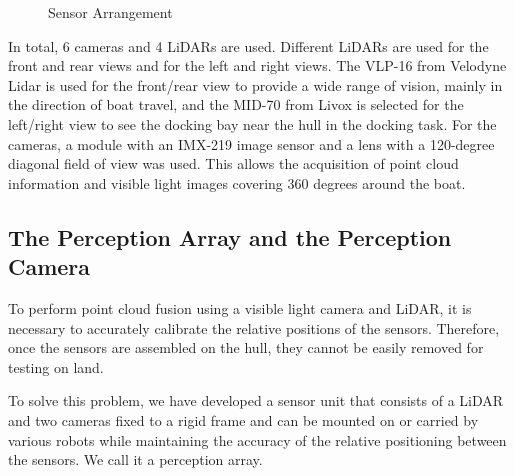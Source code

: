 \documentclass[lettersize,journal]{IEEEtran}
\begin{document}
\begin{figure}[htbp]
  \begin{center}
  \end{center}
  \caption{Sensor Arrangement}
  \label{fig:sensor_arrangement}
\end{figure}

In total, 6 cameras and 4 LiDARs are used.
Different LiDARs are used for the front and rear views and for the left and right views.
The VLP-16 from Velodyne Lidar is used for the front/rear view to provide a wide range of vision, mainly in the direction of boat travel, and the MID-70 from Livox is selected for the left/right view to see the docking bay near the hull in the docking task.
For the cameras, a module with an IMX-219 image sensor and a lens with a 120-degree diagonal field of view was used.
This allows the acquisition of point cloud information and visible light images covering 360 degrees around the boat.

\subsection{The Perception Array and the Perception Camera}

To perform point cloud fusion using a visible light camera and LiDAR, it is necessary to accurately calibrate the relative positions of the sensors.
Therefore, once the sensors are assembled on the hull, they cannot be easily removed for testing on land.

To solve this problem, we have developed a sensor unit that consists of a LiDAR and two cameras fixed to a rigid frame and can be mounted on or carried by various robots while maintaining the accuracy of the relative positioning between the sensors.
We call it a perception array.
\end{document}
